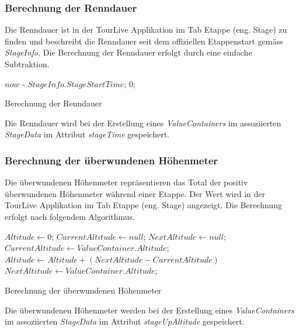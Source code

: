 \subsubsection{Berechnung der Renndauer}
Die Renndauer ist in der TourLive Applikation im Tab Etappe (eng. Stage) zu finden und beschreibt die Renndauer seit dem offiziellen Etappenstart gemäss \textit{StageInfo}. Die Berechnung der Renndauer erfolgt durch eine einfache Subtraktion.


\begin{algorithm}[H]
\begin{algorithmic}[1]
\vspace{5pt}
     \State \Return $now$ - $StageInfo.StageStartTime$;
\Else
     \State \Return $0$;
\EndIf
\end{algorithmic}
\caption{Berechnung der Renndauer}
\end{algorithm}


Die Renndauer wird bei der Erstellung eines \textit{ValueContainers} im assoziierten \textit{StageData} im Attribut \textit{stageTime} gespeichert.

\subsubsection{Berechnung der überwundenen Höhenmeter}
Die überwundenen Höhenmeter repräsentieren das Total der positiv überwundenen Höhenmeter während einer Etappe. Der Wert wird in der TourLive Applikation im Tab Etappe (eng. Stage) angezeigt. Die Berechnung erfolgt nach folgendem Algorithmus.

\begin{algorithm}[H]
\begin{algorithmic}[1]
\vspace{5pt}
\State $Altitude \gets 0$;
\State $CurrentAltitude \gets null$;
\State $NextAltitude \gets null$;
\State $CurrentAltitude \gets ValueContainer.Altitude$;
     \State $Altitude\gets Altitude + (NextAltitude - CurrentAltitude)$
\EndIf
\Else
\State $NextAltitude \gets ValueContainer.Altitude$;
\EndIf
\EndFor
\end{algorithmic}
\caption{Berechnung der überwundenen Höhenmeter}
\end{algorithm}


Die überwundenen Höhenmeter werden bei der Erstellung eines \textit{ValueContainers} im assoziierten \textit{StageData} im Attribut \textit{stageUpAltitude} gespeichert.


